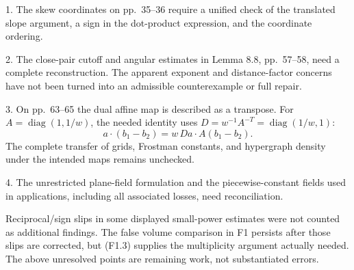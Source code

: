 \documentclass[10pt]{article}
\begin{document}
1. The skew coordinates on pp. 35–36 require a unified check of the translated slope argument, a sign in the dot-product expression, and the coordinate ordering.\par
2. The close-pair cutoff and angular estimates in Lemma 8.8, pp. 57–58, need a complete reconstruction. The apparent exponent and distance-factor concerns have not been turned into an admissible counterexample or full repair.\par
3. On pp. 63–65 the dual affine map is described as a transpose. For \(A=\operatorname{diag}(1,1/w)\), the needed identity uses \(D=w^{-1}A^{-T}=\operatorname{diag}(1/w,1)\): \[a\cdot(b_1-b_2)=w\,Da\cdot A(b_1-b_2).\] The complete transfer of grids, Frostman constants, and hypergraph density under the intended maps remains unchecked.\par
4. The unrestricted plane-field formulation and the piecewise-constant fields used in applications, including all associated losses, need reconciliation.\par
Reciprocal/sign slips in some displayed small-power estimates were not counted as additional findings. The false volume comparison in F1 persists after those slips are corrected, but (F1.3) supplies the multiplicity argument actually needed. The above unresolved points are remaining work, not substantiated errors.\par
\end{document}
